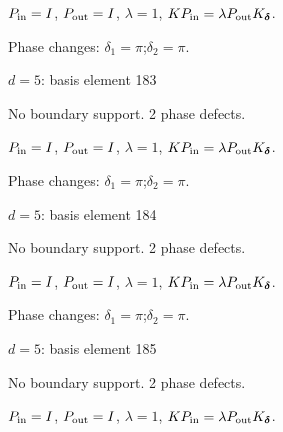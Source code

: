 \vspace{-1mm}
$P_{\rm in}=I$, \quad $P_{\rm out}=I$, \quad $\lambda=1$, \qquad $K P_{\rm in}=\lambda P_{\rm out}K_{\boldsymbol\delta}$.
\par\smallskip\begin{minipage}{.98\linewidth}\small Phase changes: $\delta_{1}=\pi$;\quad $\delta_{2}=\pi$.\end{minipage}
\vfill
{\footnotesize\texttt{}}
\newpage
{}
{\Large $d=5$: basis element 183}\par
No boundary support. 2 phase defects.
\begin{center}
\end{center}
\vspace{-1mm}
$P_{\rm in}=I$, \quad $P_{\rm out}=I$, \quad $\lambda=1$, \qquad $K P_{\rm in}=\lambda P_{\rm out}K_{\boldsymbol\delta}$.
\par\smallskip\begin{minipage}{.98\linewidth}\small Phase changes: $\delta_{1}=\pi$;\quad $\delta_{2}=\pi$.\end{minipage}
\vfill
{\footnotesize\texttt{}}
\newpage
{}
{\Large $d=5$: basis element 184}\par
No boundary support. 2 phase defects.
\begin{center}
\end{center}
\vspace{-1mm}
$P_{\rm in}=I$, \quad $P_{\rm out}=I$, \quad $\lambda=1$, \qquad $K P_{\rm in}=\lambda P_{\rm out}K_{\boldsymbol\delta}$.
\par\smallskip\begin{minipage}{.98\linewidth}\small Phase changes: $\delta_{1}=\pi$;\quad $\delta_{2}=\pi$.\end{minipage}
\vfill
{\footnotesize\texttt{}}
\newpage
{}
{\Large $d=5$: basis element 185}\par
No boundary support. 2 phase defects.
\begin{center}
\end{center}
\vspace{-1mm}
$P_{\rm in}=I$, \quad $P_{\rm out}=I$, \quad $\lambda=1$, \qquad $K P_{\rm in}=\lambda P_{\rm out}K_{\boldsymbol\delta}$.
